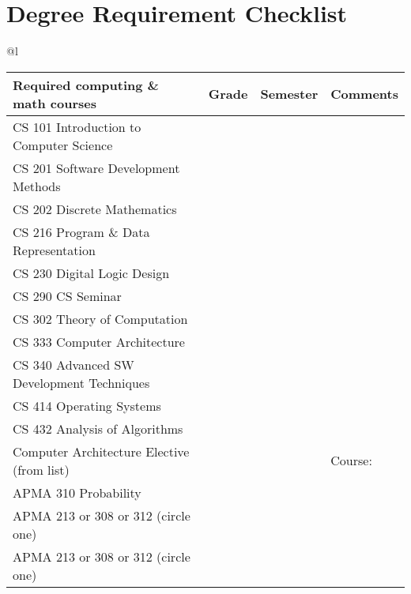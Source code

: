 \documentclass[12pt,twoside]{article}
\newcommand{\textsize}{\Large}
\newcommand{\textsize}{\normalsize}
\begin{document}
\textsize

\section{Degree Requirement Checklist}
\normalsize
\begin{tabular}{@{}l} %

\begin{tabular}{|l|l|l|l|}
\hline
\bf Required computing \& math courses & \bf Grade & \bf Semester & \bf Comments \\ \hline \hline
CS 101 Introduction to Computer Science & & & \hspace{1.8in} \\ \hline
CS 201 Software Development Methods & & & \\ \hline
CS 202 Discrete Mathematics & & & \\ \hline
CS 216 Program \& Data Representation & & & \\ \hline
CS 230 Digital Logic Design & & & \\ \hline
CS 290 CS Seminar & & & \\ \hline
CS 302 Theory of Computation & & & \\ \hline
CS 333 Computer Architecture & & & \\ \hline
CS 340 Advanced SW Development Techniques & & & \\ \hline
CS 414 Operating Systems & & & \\ \hline
CS 432 Analysis of Algorithms & & & \\ \hline
Computer Architecture Elective (from list)  & & & Course: \\ \hline
APMA 310 Probability & & & \\ \hline
APMA 213 or 308 or 312 (circle one) & & & \hspace{1.5in} \\ \hline
APMA 213 or 308 or 312 (circle one) & & & \hspace{1.5in} \\ \hline
\end{tabular}

\bigskip

\\


\end{tabular}
\end{document}
